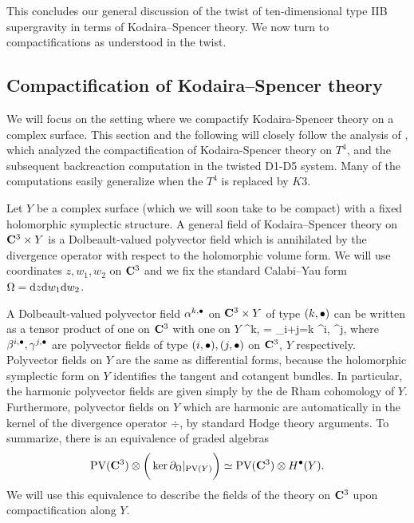 \documentclass[../main.tex]{subfiles}
\begin{document}
This concludes our general discussion of the twist of ten-dimensional type IIB supergravity in terms of Kodaira--Spencer theory. 
We now turn to compactifications as understood in the twist. 

\subsection{Compactification of Kodaira--Spencer theory}

We will focus on the setting where we compactify Kodaira-Spencer theory on a complex surface. This section and the following will closely follow the analysis of \cite{CP}, which analyzed the compactification of Kodaira-Spencer theory on $T^4$, and the subsequent backreaction computation in the twisted D1-D5 system. Many of the computations easily generalize when the $T^4$ is replaced by $K3$. 

Let $Y$ be a complex surface (which we will soon take to be compact) with a fixed holomorphic symplectic structure.
A general field of Kodaira--Spencer theory on $\mathbf{C}^3 \times Y$ is a Dolbeault-valued polyvector field which is annihilated by the divergence operator with respect to the holomorphic volume form.
We will use coordinates $z,w_1,w_2$ on $\mathbf{C}^3$ and we fix the standard Calabi--Yau form $\Omega = \mathrm{d} z \mathrm{d} w_1 \mathrm{d} w_2$.

A Dolbeault-valued polyvector field $\alpha^{k,{\bullet}}$ on $\mathbf{C}^3 \times Y$ of type $(k,{\bullet})$ can be written as a tensor product of one on $\mathbf{C}^3$ with one on $Y$
\beqn
\alpha^{k,\bu} = \sum_{i+j=k} \beta^{i,\bu} \otimes \gamma^{j,\bu} 
\eeqn
where $\beta^{i,{\bullet}},\gamma^{j,{\bullet}}$ are polyvector fields of type $(i,{\bullet}),(j,{\bullet})$ on $\mathbf{C}^3$, $Y$ respectively.
Polyvector fields on $Y$ are the same as differential forms, because the holomorphic symplectic form on $Y$ identifies the tangent and cotangent bundles. 
In particular, the harmonic polyvector fields are given simply by the de Rham cohomology of $Y$.  
Furthermore, polyvector fields on $Y$ which are harmonic are automatically in the kernel of the divergence operator $\div$, by standard Hodge theory arguments.   
To summarize, there is an equivalence of graded algebras
\[
{\rm PV} (\mathbf{C}^3) \otimes \bigg(\ker {\partial_\Omega} |_{{\rm PV}(Y)} \bigg) \simeq {\rm PV}(\mathbf{C}^3) \otimes H^{\bullet}(Y) .
\]
We will use this equivalence to describe the fields of the theory on $\mathbf{C}^3$ upon compactification along $Y$.
\end{document}

